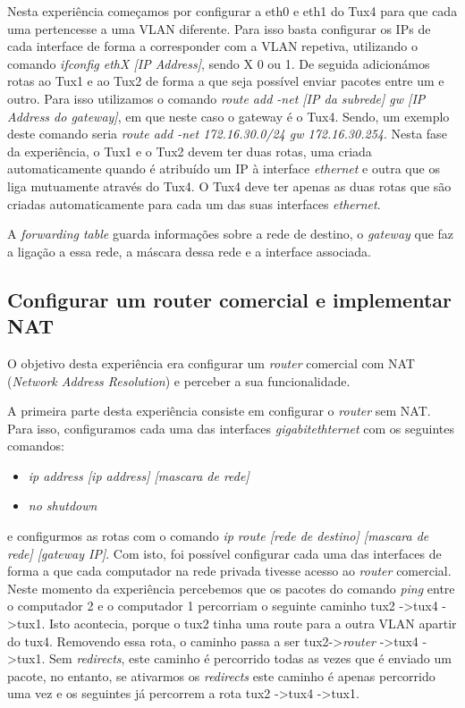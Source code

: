 \documentclass[a4paper]{article}
\begin{document}
Nesta experiência começamos por configurar a eth0 e eth1 do Tux4 para que cada uma pertencesse a uma VLAN diferente. Para isso basta configurar os IPs de cada interface de forma a corresponder com a VLAN repetiva, utilizando o comando \textit{ifconfig ethX [IP Address]}, sendo X 0 ou 1. De seguida adicionámos rotas ao Tux1 e ao Tux2 de forma a que seja possível enviar pacotes entre um e outro. Para isso utilizamos o comando \textit{route add -net [IP da subrede] gw [IP Address do gateway]}, em que neste caso o gateway é o Tux4. Sendo, um exemplo deste comando seria \textit{route add -net 172.16.30.0/24 gw 172.16.30.254}. Nesta fase da experiência, o Tux1 e o Tux2 devem ter duas rotas, uma criada automaticamente quando é atribuído um IP à interface \textit{ethernet} e outra que os liga mutuamente através do Tux4. O Tux4 deve ter apenas as duas rotas que são criadas automaticamente para cada um das suas interfaces \textit{ethernet}.

A \textit{forwarding table} guarda informações sobre a rede de destino, o \textit{gateway} que faz a ligação a essa rede, a máscara dessa rede e a interface associada.



\subsection{Configurar um router comercial e implementar NAT}

O objetivo desta experiência era configurar um \textit{router} comercial com NAT (\textit{Network Address Resolution}) e perceber a sua funcionalidade.

A primeira parte desta experiência consiste em configurar o \textit{router} sem NAT. Para isso, configuramos cada uma das interfaces \textit{gigabitethternet} com os seguintes comandos:
\begin{itemize}
	\item \textit{ip address [ip address] [mascara de rede]}
	\item \textit{no shutdown}
\end{itemize}
e configurmos as rotas com o comando \textit{ip route [rede de destino] [mascara de rede] [gateway IP]}. Com isto, foi possível configurar cada uma das interfaces de forma a que cada computador na rede privada tivesse acesso ao \textit{router} comercial. Neste momento da experiência percebemos que os pacotes do comando \textit{ping} entre o computador 2 e o computador 1 percorriam o seguinte caminho tux2 -\textgreater tux4 -\textgreater tux1. Isto acontecia, porque o tux2 tinha uma route para a outra VLAN apartir do tux4. Removendo essa rota, o caminho passa a ser tux2-\textgreater \textit{router} -\textgreater tux4 -\textgreater tux1. Sem \textit{redirects}, este caminho é percorrido todas as vezes que é enviado um pacote, no entanto, se ativarmos os \textit{redirects} este caminho é apenas percorrido uma vez e os seguintes já percorrem a rota tux2 -\textgreater tux4 -\textgreater tux1.
\end{document}
